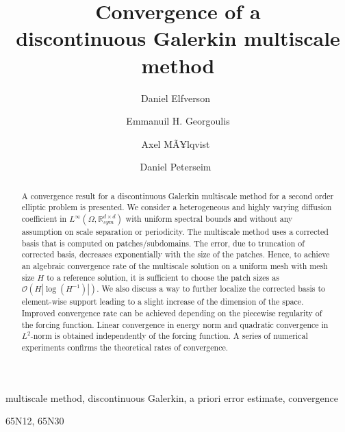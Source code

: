 \documentclass[10pt]{article}
\numberwithin{equation}{section}
\theoremstyle{plain}
\theoremstyle{definition}
\theoremstyle{remark}
\begin{document}
 
\title{Convergence of a \\ discontinuous Galerkin multiscale method}

\author{Daniel Elfverson\footnotemark[2]\ \footnotemark[5] \and Emmanuil H. Georgoulis\footnotemark[3] \and Axel MÃ¥lqvist\footnotemark[2]\ \footnotemark[5] \and Daniel Peterseim\footnotemark[4]\ \footnotemark[6]}


\pagestyle{myheadings}
\thispagestyle{plain}

\maketitle
\begin{abstract} A convergence result for a discontinuous Galerkin multiscale method for a second order elliptic problem  is presented. We consider a heterogeneous and highly varying diffusion coefficient in $L^\infty(\Omega,\mathbb{R}^{d\times d}_{sym})$ with uniform spectral bounds and without any assumption on scale separation or periodicity. The multiscale method uses a corrected basis that is computed on patches/subdomains. The error, due to truncation of corrected basis, decreases exponentially with the size of the patches. Hence, to achieve an algebraic convergence rate of the multiscale solution on a uniform mesh with mesh size $H$ to a reference solution, it is sufficient to choose the patch sizes as $\mathcal{O}(H|\log(H^{-1})|)$. We also discuss a way to further localize the corrected basis to element-wise support leading to a slight increase of the dimension of the space. Improved convergence rate can be achieved depending on the piecewise regularity of the forcing function. Linear convergence in energy norm and quadratic convergence in $L^2$-norm is obtained independently of the forcing function. A series of numerical experiments confirms the theoretical rates of convergence. 
\end{abstract}

\begin{keywords}
  multiscale method, discontinuous Galerkin, a priori error estimate, convergence  
\end{keywords}
\begin{AMS}
   65N12, 65N30
\end{AMS}
\end{document}
